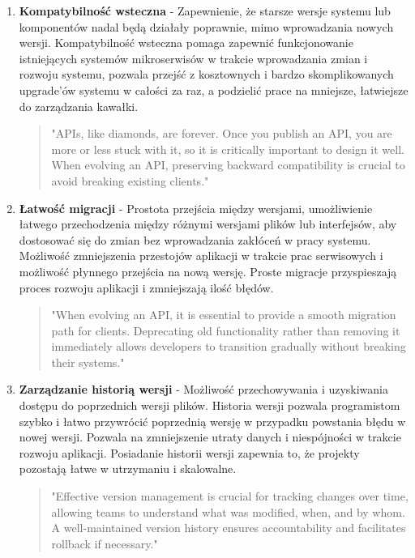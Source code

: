 \documentclass[runningheads,12pt]{llncs}
\begin{document}
\begin{enumerate}
    \item \textbf{Kompatybilność wsteczna} - Zapewnienie, że starsze wersje systemu lub komponentów nadal będą działały poprawnie, mimo wprowadzania nowych wersji. Kompatybilność wsteczna pomaga zapewnić funkcjonowanie istniejących systemów mikroserwisów w trakcie wprowadzania zmian i rozwoju systemu, pozwala przejść z kosztownych i bardzo skomplikowanych upgrade'ów systemu w całości za raz, a podzielić prace na mniejsze, łatwiejsze do zarządzania kawałki.
    \begin{quote}
        "APIs, like diamonds, are forever. Once you publish an API, you are more or less stuck with it, so it is critically important to design it well. When evolving an API, preserving backward compatibility is crucial to avoid breaking existing clients." ~\cite[p. 75]{bloch2018effective}
    \end{quote}
    
    \item \textbf{Łatwość migracji} - Prostota przejścia między wersjami, umożliwienie łatwego przechodzenia między różnymi wersjami plików lub interfejsów, aby dostosować się do zmian bez wprowadzania zakłóceń w pracy systemu. Możliwość zmniejszenia przestojów aplikacji w trakcie prac serwisowych i możliwość płynnego przejścia na nową wersję. Proste migracje przyspieszają proces rozwoju aplikacji i zmniejszają ilość błędów.
    \begin{quote}
        "When evolving an API, it is essential to provide a smooth migration path for clients. Deprecating old functionality rather than removing it immediately allows developers to transition gradually without breaking their systems." ~\cite[p. 78]{bloch2018effective}
    \end{quote}
    
    \item \textbf{Zarządzanie historią wersji} - Możliwość przechowywania i uzyskiwania dostępu do poprzednich wersji plików. Historia wersji pozwala programistom szybko i łatwo przywrócić poprzednią wersję w przypadku powstania błędu w nowej wersji. Pozwala na zmniejszenie utraty danych i niespójności w trakcie rozwoju aplikacji. Posiadanie historii wersji zapewnia to, że projekty pozostają łatwe w utrzymaniu i skalowalne.
    \begin{quote}
        "Effective version management is crucial for tracking changes over time, allowing teams to understand what was modified, when, and by whom. A well-maintained version history ensures accountability and facilitates rollback if necessary." ~\cite[p. 150]{rubin2012essential}
    \end{quote}
    

\end{enumerate}
\end{document}
